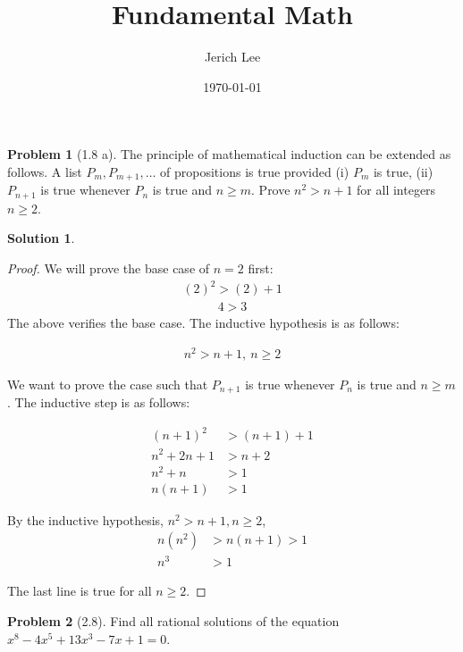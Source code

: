 \documentclass[12pt]{article}
\title{Fundamental Math}
\author{Jerich Lee}
\date{\today}
\theoremstyle{definition} %
\newtheorem{solution}{Solution}
\newtheorem{problem}{Problem}
\theoremstyle{plain} %
\begin{document}
\maketitle
\begin{problem}[1.8 a]
  The principle of mathematical induction can be extended as follows. A list $P_{m}, P_{m+1}, \dots$ of propositions is true provided (i) $P_{m}$ is true, (ii) $P_{n+1}$ is true whenever $P_{n}$ is true and $n\geq m$.
  Prove $n^2>n+1$ for all integers $n\geq2$.
  \end{problem}
  
  \begin{solution}
  \begin{proof}
      We will prove the base case of $n=2$ first:
  \begin{align}
  (2)^2>(2)+1
  \end{align}
  \begin{align}
  4>3
  \end{align}
  The above verifies the base case. The inductive hypothesis is as follows:
  
  \begin{align}
  n^2>n+1, \ n\geq 2
  \end{align}
  
  We want to prove the case such that $P_{n+1}$ is true whenever $P_{n}$ is true and $n\geq m$. The inductive step is as follows:
  
  \begin{align}
  (n+1)^2 &> (n+1)+1 \\
  n^2+2n+1 &> n+2 \\
  n^2+n &> 1 \\
  n(n+1) &> 1
  \end{align}
  
  By the inductive hypothesis, $n^2>n+1, n\geq 2$,
  \begin{align}
  n(n^2) &> n(n+1) > 1 \\
  n^3 &> 1
  \end{align}
  
  The last line is true for all $n\geq 2$.  
  \end{proof}
  
  \end{solution}
  \begin{problem}[2.8]
      Find all rational solutions of the equation $x^8-4x^5+13x^3-7x+1=0$.
  \end{problem}
  
\end{document}
